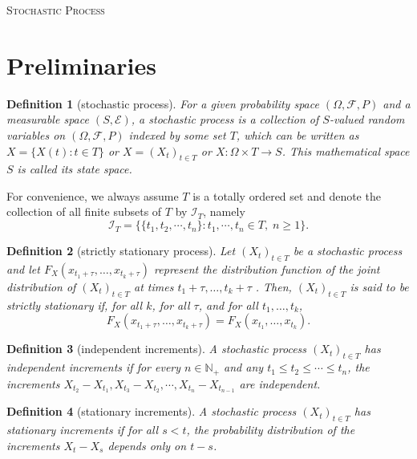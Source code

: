 \documentclass{article}
\newtheorem{definition}{Definition}[section]
\theoremstyle{nonumberplain}
\begin{document}
	\begin{center}
	\textsc{\Huge Stochastic Process}	
\end{center}
\vspace{1em} 

\section{Preliminaries}
\begin{definition}[stochastic process]
For a given probability space $(\Omega ,{\mathcal{F}},P)$ and a measurable space $(S,\mathcal{E})$, a \emph{stochastic process} is a collection of $S$-valued random variables on $(\Omega ,{\mathcal{F}},P)$ indexed by some set $T$, which can be written as $X=\{X(t):t\in T\}$ or $X=(X_t)_{t\in T}$ or $X:\Omega \times T\rightarrow S$. This mathematical space $S$ is called its state space. 
\end{definition}

\noindent For convenience, we always assume $T$ is a totally ordered set and denote the collection of all finite subsets of $T$ by $\mathcal{I}_T$, namely
\[
\mathcal{I}_T=\{\{t_1,t_2,\cdots,t_n\}:t_1,\cdots,t_n\in T,\;n\ge 1\}.
\]

\begin{definition}[strictly stationary process]
	Let $(X_t)_{t\in T}$ be a stochastic process and let \newline $F_{{X}}(x_{{t_{1}+\tau }},\ldots ,x_{{t_{k}+\tau }})$ represent the  distribution function of the joint distribution of $(X_t)_{t\in T}$ at times $t_{1}+\tau ,\ldots ,t_{k}+\tau$ . Then, $(X_t)_{t\in T}$ is said to be strictly stationary if, for all $k$, for all $\tau$, and for all $ t_{1},\ldots ,t_{k}$,
	\[
	F_{{X}}(x_{{t_{1}+\tau }},\ldots ,x_{{t_{k}+\tau }})=F_{{X}}(x_{{t_{1}}},\ldots ,x_{{t_{k}}}).
	\]
\end{definition}

\begin{definition}[independent increments]
	A stochastic process $(X_t)_{t\in T}$ has \emph{independent increments} if for every $n\in \mathbb{N}_+$ and any $t_1\le t_2 \le\cdots\le t_n$, the increments $X_{t_2}-X_{t_1},X_{t_3}-X_{t_2},\cdots,X_{t_n}-X_{t_{n-1}}$ are independent.
\end{definition}

\begin{definition}[stationary increments]
	A stochastic process $(X_t)_{t\in T}$ has \emph{stationary increments} if for all $s<t$, the probability distribution of the increments $X_{t}-X_{s}$ depends only on $t-s$.
\end{definition}
\end{document}
